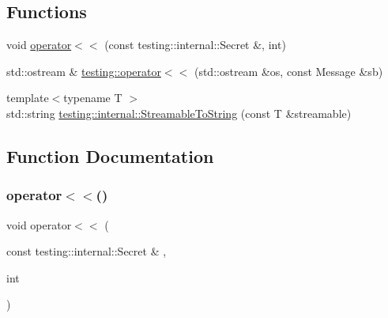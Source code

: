 \subsection*{Functions}
\begin{DoxyCompactItemize}
\item 
void \hyperlink{gtest-message_8h_ae8f0c86e5c506587b62315e24a918563}{operator$<$$<$} (const testing\+::internal\+::\+Secret \&, int)
\item 
std\+::ostream \& \hyperlink{namespacetesting_a7b802e532fd68749765cb7dc156130db}{testing\+::operator$<$$<$} (std\+::ostream \&os, const Message \&sb)
\item 
{\footnotesize template$<$typename T $>$ }\\std\+::string \hyperlink{namespacetesting_1_1internal_aad4beed95d0846e6ffc5da0978ef3bb9}{testing\+::internal\+::\+Streamable\+To\+String} (const T \&streamable)
\end{DoxyCompactItemize}


\subsection{Function Documentation}
\mbox{\label{gtest-message_8h_ae8f0c86e5c506587b62315e24a918563}} 
\subsubsection{\texorpdfstring{operator$<$$<$()}{operator<<()}}
{\footnotesize\ttfamily void operator$<$$<$ (\begin{DoxyParamCaption}\item[{const testing\+::internal\+::\+Secret \&}]{,  }\item[{int}]{ }\end{DoxyParamCaption})}

